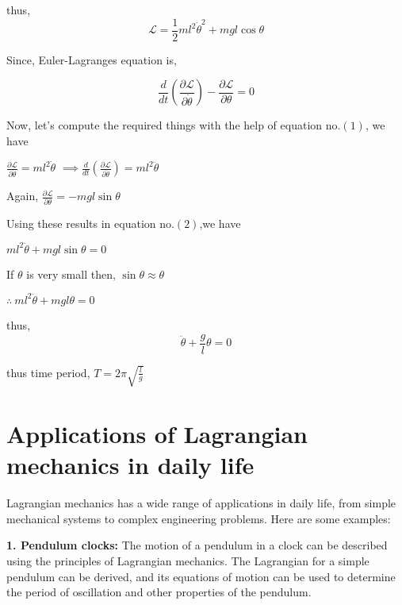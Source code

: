 \documentclass[12pt, a4paper]{article} %
\begin{document}
thus,
\begin{equation*}
    \mathscr{L} = \frac{1}{2}ml^2\dot{\theta}^2 + mgl\cos\theta \tag*{(1)}
\end{equation*}

Since, Euler-Lagranges equation is,

\begin{equation*}
    \frac{d}{dt}\left(\frac{\partial \mathscr{L}}{\partial \dot{\theta}}\right) - \frac{\partial \mathscr{L}}{\partial \theta} = 0 \tag*{(2)}
\end{equation*}

Now, let's compute the required things with the help of equation no.$(1)$, we have


\vspace*{4mm}
$\displaystyle \frac{\partial \mathscr{L}}{\partial \dot{\theta}} = ml^2\dot{\theta}$
\vspace*{4mm}
$\displaystyle \implies \frac{d}{dt}\left(\frac{\partial \mathscr{L}}{\partial \dot{\theta}}\right) = ml^2\ddot{\theta}$

Again,  $\displaystyle \frac{\partial \mathscr{L}}{\partial \theta} = -mgl\sin\theta$

Using these results in equation no.$(2)$,we have

$\displaystyle ml^2\ddot{\theta} + mgl\sin\theta = 0$


If $\theta$ is very small then, $\sin\theta \approx \theta$


$\displaystyle \therefore\ ml^2\ddot{\theta} + mgl\theta = 0$

thus, 
\begin{equation*}
    \boxed{\ddot{\theta} + \frac{g}{l}\theta = 0}
\end{equation*}

thus time period, $\displaystyle T = 2\pi \sqrt{\frac{l}{g}}$

\section{Applications of Lagrangian mechanics in daily life}

Lagrangian mechanics has a wide range of applications in daily life, from simple mechanical systems to complex engineering problems. Here are some examples:

{\bf 1. Pendulum clocks:} The motion of a pendulum in a clock can be described using the principles of Lagrangian mechanics. The Lagrangian for a simple pendulum can be derived, and its equations of motion can be used to determine the period of oscillation and other properties of the pendulum.
\end{document}
